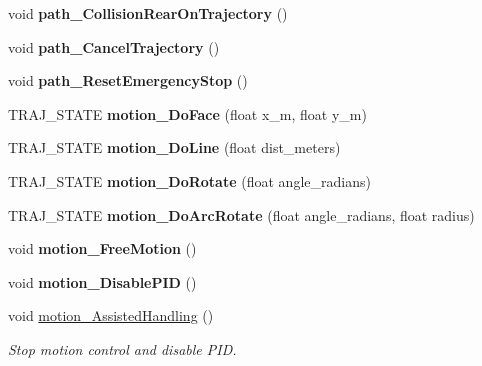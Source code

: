 \begin{DoxyCompactItemize}
void {\bfseries path\+\_\+\+Collision\+Rear\+On\+Trajectory} ()
\item 
\mbox{\label{classAsservDriver__LegoAngle_a8ab6e4a580bed13339ca794ea221b203}} 
void {\bfseries path\+\_\+\+Cancel\+Trajectory} ()
\item 
\mbox{\label{classAsservDriver__LegoAngle_a318021fa25eafee3dedaa6a5ef111b23}} 
void {\bfseries path\+\_\+\+Reset\+Emergency\+Stop} ()
\item 
\mbox{\label{classAsservDriver__LegoAngle_a835743339b4e77f41ad54d103084a6a9}} 
T\+R\+A\+J\+\_\+\+S\+T\+A\+TE {\bfseries motion\+\_\+\+Do\+Face} (float x\+\_\+m, float y\+\_\+m)
\item 
\mbox{\label{classAsservDriver__LegoAngle_ac72ebe0e1ac4bd43723b34532ba23d44}} 
T\+R\+A\+J\+\_\+\+S\+T\+A\+TE {\bfseries motion\+\_\+\+Do\+Line} (float dist\+\_\+meters)
\item 
\mbox{\label{classAsservDriver__LegoAngle_a7c6a30280929895551faa30dd01f2716}} 
T\+R\+A\+J\+\_\+\+S\+T\+A\+TE {\bfseries motion\+\_\+\+Do\+Rotate} (float angle\+\_\+radians)
\item 
\mbox{\label{classAsservDriver__LegoAngle_a73960d14cc7b286e7f061c139aaceecd}} 
T\+R\+A\+J\+\_\+\+S\+T\+A\+TE {\bfseries motion\+\_\+\+Do\+Arc\+Rotate} (float angle\+\_\+radians, float radius)
\item 
\mbox{\label{classAsservDriver__LegoAngle_a8a5399bbaff35b9ed83967ff897d3da8}} 
void {\bfseries motion\+\_\+\+Free\+Motion} ()
\item 
\mbox{\label{classAsservDriver__LegoAngle_a71bbf26d305646235987895fe8268314}} 
void {\bfseries motion\+\_\+\+Disable\+P\+ID} ()
\item 
\mbox{\label{classAsservDriver__LegoAngle_a86b335e94ff1df802eb9161ff68e6e5b}} 
void \hyperlink{classAsservDriver__LegoAngle_a86b335e94ff1df802eb9161ff68e6e5b}{motion\+\_\+\+Assisted\+Handling} ()
\begin{DoxyCompactList}\small\item\em Stop motion control and disable P\+ID. \end{DoxyCompactList}\item 

\end{DoxyCompactItemize}
